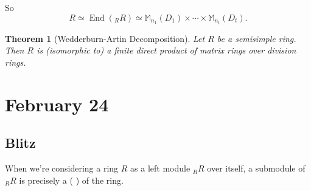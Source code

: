 \documentclass[12pt]{article}
\newtheorem{theorem}{Theorem}[section]
\theoremstyle{definition}
\DeclareMathOperator\End{End}
\newcommand{\m}{\mathbb{M}}
\begin{document}
So 
\begin{equation}
    R\simeq\End(_RR)\simeq\boxed{\m_{n_1}(D_1)\times\dotsb\times\m_{n_t}(D_t).}
\end{equation}
\begin{theorem}[Wedderburn-Artin Decomposition]
    Let $R$ be a semisimple ring. Then $R$ is (isomorphic to) a finite direct product of matrix rings over division rings.
\end{theorem}
\section{February 24}
\subsection{Blitz}
When we're considering a ring $R$ as a left module $_RR$ over itself, a submodule of $_RR$ is precisely a ( ) of the ring.
\end{document}
